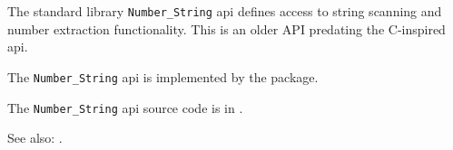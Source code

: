 
The standard library {\tt Number\_String} api defines access to string scanning 
and number extraction functionality.  This is an older API predating the C-inspired  
 api.

The {\tt Number\_String} api is implemented by the  package.

The {\tt Number\_String} api source code is in .

See also:   .

